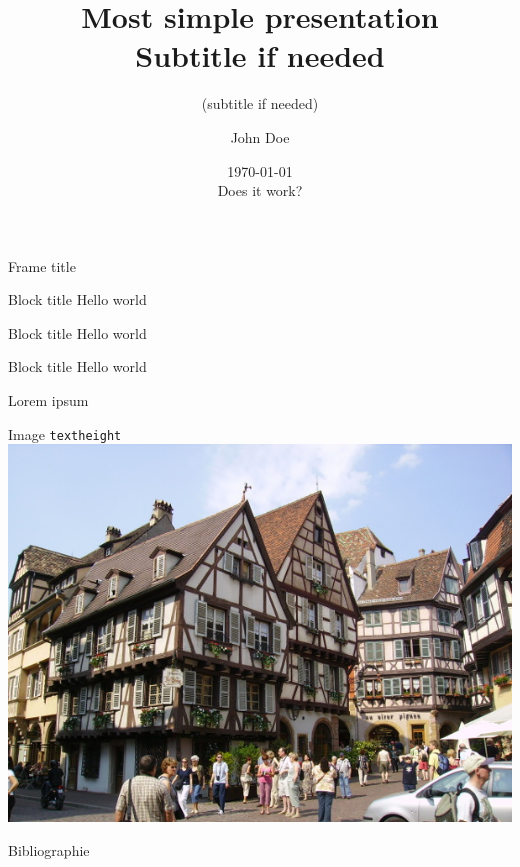 \documentclass[aspectratio=169]{beamer}
\title{Most simple presentation\\Subtitle if needed}
\subtitle{(subtitle if needed)}
\author{John Doe}
\institute{ENSTA Bretagne}
\date{\today\\Does it work?}
\begin{document}
{
	\begin{frame}[plain]
	\maketitle
	\end{frame}
}

\begin{frame}{Frame title}
\begin{exampleblock}{Block title}
Hello world
\end{exampleblock}
\begin{block}{Block title}
Hello world 
\end{block}
\begin{alertblock}{Block title}
Hello world \cite{Feynman1941}
\end{alertblock}
\end{frame}
\begin{frame}[allowframebreaks]{Lorem ipsum}
\lipsum[1-3]
\end{frame}
\begin{frame}{Image \texttt{textheight}}
\centering
\includegraphics[height=.985\textheight]{images/architecturebretonne_wikipedia.jpg}
\end{frame}
\begin{frame}{Bibliographie}
\printbibliography
\end{frame}
\end{document}
